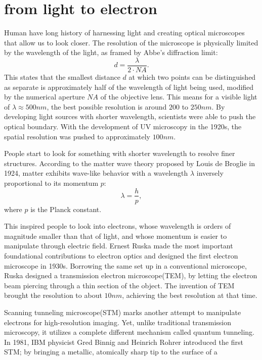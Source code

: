 \section{from light to electron}
Human have long history of harnessing light and creating optical microscopes that allow us to look closer. The resolution of the microscope is physically limited by the wavelength of the light, as framed by Abbe's diffraction limit:
\begin{equation}
	d = \frac{\lambda}{2\cdot NA}.
\end{equation}
This states that the smallest distance $d$ at which two points can be distinguished as separate is approximately half of the wavelength of light being used, modified by the numerical aperture $NA$ of the objective lens. This means for a visible light of $\lambda \approx 500nm$, the best possible resolution is around $200$ to $250nm$. By developing light sources with shorter wavelength, scientists were able to push the optical boundary. With the development of UV microscopy in the 1920s, the spatial resolution was pushed to approximately $100nm$. 

People start to look for something with shorter wavelength to resolve finer structures. According to the matter wave theory proposed by Louis de Broglie in 1924, matter exhibits wave-like behavior with a wavelength $\lambda$ inversely proportional to its momentum $p$: 
\begin{equation}
	\lambda = \frac{h}{p},
\end{equation}
where $p$ is the Planck constant. 

This inspired people to look into electrons, whose wavelength is orders of magnitude smaller than that of light, and whose momentum is easier to manipulate through electric field. Ernest Ruska made the most important foundational contributions to electron optics and designed the first electron microscope in 1930s. Borrowing the same set up in a conventional microscope, Ruska designed a transmission electron microscope(TEM), by letting the electron beam piercing through a thin section of the object. The invention of TEM brought the resolution to about $10nm$, achieving the best resolution at that time. 

Scanning tunneling microscope(STM) marks another attempt to manipulate electrons for high-resolution imaging. Yet, unlike traditional transmission microscopy, it utilizes a complete different mechanism called quantum tunneling. In 1981, IBM physicist Gred Binnig and Heinrich Rohrer introduced the first \ac{STM}; by bringing a metallic, atomically sharp tip to the surface of a 




























